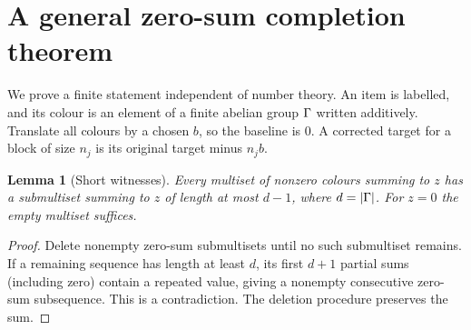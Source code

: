 \documentclass[11pt]{article}
\newtheorem{lemma}[theorem]{Lemma}
\theoremstyle{remark}\newtheorem{remark}[theorem]{Remark}
\begin{document}
\section{A general zero-sum completion theorem}\label{sec:packing}
We prove a finite statement independent of number theory. An item is labelled, and its colour is an element of a finite abelian group $\Gamma$ written additively. Translate all colours by a chosen $b$, so the baseline is $0$. A corrected target for a block of size $n_j$ is its original target minus $n_jb$.

\begin{lemma}[Short witnesses]\label{lem:short}
Every multiset of nonzero colours summing to $z$ has a submultiset summing to $z$ of length at most $d-1$, where $d=|\Gamma|$. For $z=0$ the empty multiset suffices.
\end{lemma}
\begin{proof}
Delete nonempty zero-sum submultisets until no such submultiset remains. If a remaining sequence has length at least $d$, its first $d+1$ partial sums (including zero) contain a repeated value, giving a nonempty consecutive zero-sum subsequence. This is a contradiction. The deletion procedure preserves the sum.
\end{proof}
\end{document}
